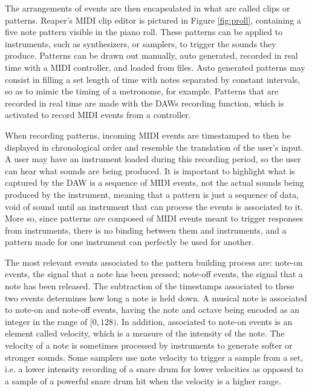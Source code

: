\documentclass[12pt, a4paper, hidelinks]{report}
\begin{document}
	The arrangements of events are then encapsulated in what are called clips or patterns. Reaper's MIDI clip editor is pictured in Figure \ref{fig:proll}, containing a five note pattern visible in the piano roll. These patterns can be applied to instruments, such as synthesizers, or samplers, to trigger the sounds they produce. Patterns can be drawn out manually, auto generated, recorded in real time with a MIDI controller, and loaded from files. Auto generated patterns may consist in filling a set length of time with notes separated by constant intervals, so as to mimic the timing of a metronome, for example. Patterns that are recorded in real time are made with the DAWs recording function, which is activated to record MIDI events from a controller. \par 
	
	When recording patterns, incoming MIDI events are timestamped to then be displayed in chronological order and resemble the translation of the user's input. A user may have an instrument loaded during this recording period, so the user can hear what sounds are being produced. It is important to highlight what is captured by the DAW is a sequence of MIDI events, not the actual sounds being produced by the instrument, meaning that a pattern is just a sequence of data, void of sound until an instrument that can process the events is associated to it. More so, since patterns are composed of MIDI events meant to trigger responses from instruments, there is no binding between them and instruments, and a pattern made for one instrument can perfectly be used for another. \par 
	
	The most relevant events associated to the pattern building process are: note-on events, the signal that a note has been pressed; note-off events, the signal that a note has been released. The subtraction of the timestamps associated to these two events determines how long a note is held down. A musical note is associated to note-on and note-off events, having the note and octave being encoded as an integer in the range of $[0, 128)$. In addition, associated to note-on events is an element called velocity, which is a measure of the intensity of the note. The velocity of a note is sometimes processed by instruments to generate softer or stronger sounds. Some samplers use note velocity to trigger a sample from a set, i.e. a lower intensity recording of a snare drum for lower velocities as opposed to a sample of a powerful snare drum hit when the velocity is a higher range.
	\par
	
\end{document}
